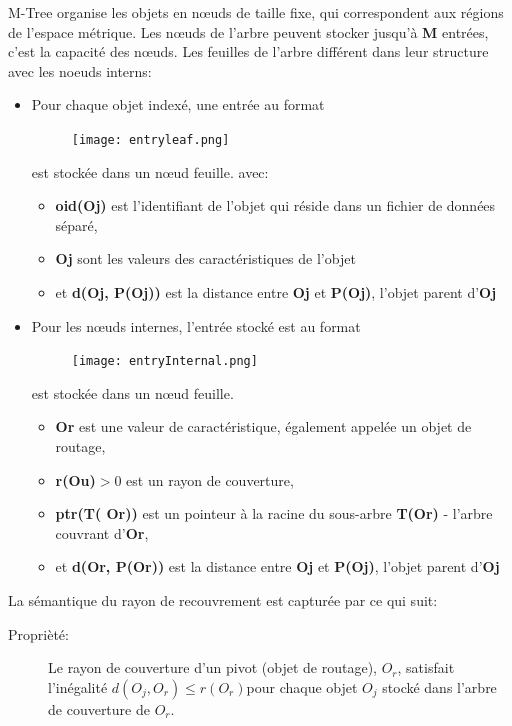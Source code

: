 M-Tree organise les objets en nœuds de taille fixe, qui correspondent aux régions de l'espace métrique. Les nœuds de l'arbre peuvent stocker jusqu'à \textbf{M} entrées, c'est la capacité des nœuds. Les feuilles de l’arbre différent dans leur structure avec les noeuds interns:
\begin{itemize}
	\item Pour chaque objet indexé, une entrée au format 
	\begin{figure}[H]
		\centering
		\texttt{[image: entryleaf.png]} %
	\end{figure} 
	est stockée dans un nœud feuille. avec:
	\begin{itemize}
		\item \textbf{oid(Oj)} est l'identifiant de l'objet qui réside dans un fichier de données séparé,
		\item \textbf{Oj} sont les valeurs des caractéristiques de l'objet 
		\item et \textbf{d(Oj, P(Oj))} est la distance entre \textbf{Oj} et \textbf{P(Oj)}, l'objet parent d'\textbf{Oj}
	\end{itemize}

	\item Pour les nœuds internes, l'entrée stocké est au format
	\begin{figure}[H]
		\centering
		\texttt{[image: entryInternal.png]} %
	\end{figure} 
	est stockée dans un nœud feuille.
	\begin{itemize}
		\item \textbf{Or} est une valeur de caractéristique, également appelée un objet de routage,
		\item \textbf{r(Ou)}$>0$ est un rayon de couverture, 
		\item \textbf{ptr(T( Or))} est un pointeur à la racine du sous-arbre \textbf{T(Or)} - l'arbre couvrant d'\textbf{Or}, 
		\item et \textbf{d(Or, P(Or))} est la distance entre \textbf{Oj} et \textbf{P(Oj)}, l'objet parent d'\textbf{Oj}
	\end{itemize}
\end{itemize}


La sémantique du rayon de recouvrement est capturée par ce qui suit:
\begin{description}
	\item[Proprièté:] Le rayon de couverture d'un pivot (objet de routage), $ O_r $, satisfait l'inégalité 
	$ d(O_j, O_r) \le r(O_r) $pour chaque objet $ O_j $ stocké dans l'arbre de couverture de $ O_r $.
\end{description}

